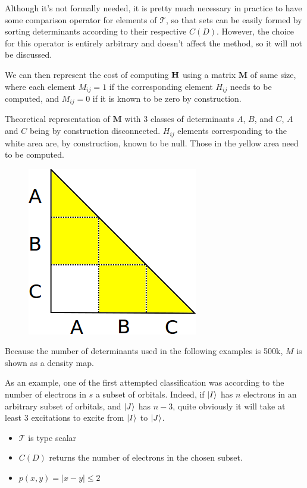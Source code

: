 \documentclass[./thesis.tex]{subfiles}
\begin{document}
Although it's not formally needed, it is pretty much necessary in practice to have some comparison operator for elements of $\mathcal{T}$, so that sets can be easily formed by sorting determinants according to their respective $C(D)$. However, the choice for this operator is entirely arbitrary and doesn't affect the method, so it will not be discussed.
    
    
We can then represent the cost of computing $\mathbf{H}$ using a matrix $\mathbf{M}$ of same size, where each element $M_{ij}=1$ if the corresponding element $H_{ij}$ needs to be computed, and $M_{ij}=0$ if it is known to be zero by construction.

\alert{
Theoretical representation of $\mathbf{M}$ with 3 classes of determinants $A$, $B$, and $C$, $A$ and $C$ being by construction disconnected. $H_{ij}$ elements corresponding to the white area are, by construction, known to be null. Those in the yellow area need to be computed.
}
    
\begin{figure}[h!]
	\begin{center}
		\includegraphics[width=0.4\columnwidth]{figures/davidson/disconnected_classes}
		\caption{{\label{generators_selectors}
		}}
	\end{center}
\end{figure}

Because the number of determinants used in the following examples is 500k, $M$ is shown as a density map.

As an example, one of the first attempted classification was according to the number of electrons in $s$ a subset of orbitals. Indeed, if $\ket I$ has $n$ electrons in an arbitrary subset of orbitals, and $\ket J$ has $n-3$, quite obviously it will take at least 3 excitations to excite from $\ket I$ to $\ket J$.
\begin{itemize}
	\item
	$\mathcal{T}$ is type scalar
	\item
	$C(D)$ returns the number of electrons in the chosen subset.
	\item
	$p(x, y) = |x-y| \leq 2$
\end{itemize}
\end{document}
